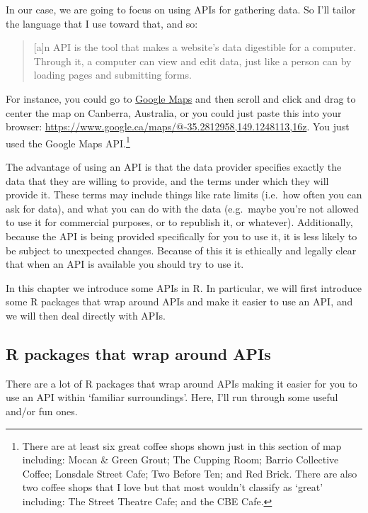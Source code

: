 \documentclass[
]{book}
\begin{document}
In our case, we are going to focus on using APIs for gathering data. So I'll tailor the language that I use toward that, and so:

\begin{quote}
{[}a{]}n API is the tool that makes a website's data digestible for a computer. Through it, a computer can view and edit data, just like a person can by loading pages and submitting forms. \citep[Chapter 1]{zapierapis}
\end{quote}

For instance, you could go to \href{https://www.google.ca/maps}{Google Maps} and then scroll and click and drag to center the map on Canberra, Australia, or you could just paste this into your browser: \url{https://www.google.ca/maps/@-35.2812958,149.1248113,16z}. You just used the Google Maps API.\footnote{There are at least six great coffee shops shown just in this section of map including: Mocan \& Green Grout; The Cupping Room; Barrio Collective Coffee; Lonsdale Street Cafe; Two Before Ten; and Red Brick. There are also two coffee shops that I love but that most wouldn't classify as `great' including: The Street Theatre Cafe; and the CBE Cafe.}

The advantage of using an API is that the data provider specifies exactly the data that they are willing to provide, and the terms under which they will provide it. These terms may include things like rate limits (i.e.~how often you can ask for data), and what you can do with the data (e.g.~maybe you're not allowed to use it for commercial purposes, or to republish it, or whatever). Additionally, because the API is being provided specifically for you to use it, it is less likely to be subject to unexpected changes. Because of this it is ethically and legally clear that when an API is available you should try to use it.

In this chapter we introduce some APIs in R. In particular, we will first introduce some R packages that wrap around APIs and make it easier to use an API, and we will then deal directly with APIs.

\hypertarget{r-packages-that-wrap-around-apis}{%
\subsection{R packages that wrap around APIs}\label{r-packages-that-wrap-around-apis}}

There are a lot of R packages that wrap around APIs making it easier for you to use an API within `familiar surroundings'. Here, I'll run through some useful and/or fun ones.
\end{document}
